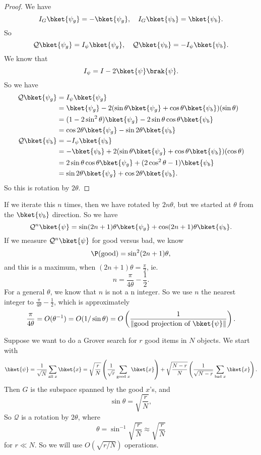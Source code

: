 \documentclass[a4paper]{article}
\begin{document}
\begin{proof}
  We have
  \[
    I_G \bket{\psi_g} = - \bket{\psi_g},\quad I_G \bket{\psi_b} = \bket{\psi_b}.
  \]
  So
  \[
    \mathcal{Q} \bket{\psi_g} = I_\psi \bket{\psi_g}, \quad \mathcal{Q} \bket{\psi_b} = - I_\psi \bket{\psi_b}.
  \]
  We know that
  \[
    I_\psi = I - 2\bket{\psi}\brak{\psi}.
  \]
  So we have
  \begin{align*}
    \mathcal{Q} \bket{\psi_g} &= I_\psi \bket{\psi_g}\\
    &= \bket{\psi_g} - 2(\sin \theta \bket{\psi_g} + \cos \theta \bket{\psi_b})(\sin \theta)\\
    &= (1 - 2 \sin^2 \theta) \bket{\psi_g} - 2 \sin \theta \cos \theta \bket{\psi_b}\\
    &= \cos 2\theta \bket{\psi_g} - \sin 2\theta \bket{\psi_b}\\
    \mathcal{Q} \bket{\psi_b} &= - I_\psi \bket{\psi_b}\\
    &= -\bket{\psi_b} + 2(\sin \theta \bket{\psi_g} + \cos \theta \bket{\psi_b})(\cos \theta)\\
    &= 2 \sin \theta \cos \theta \bket{\psi_g} + (2\cos^2 \theta - 1) \bket{\psi_b}\\
    &= \sin 2 \theta \bket{\psi_g} + \cos 2 \theta \bket{\psi_b}.
  \end{align*}
  So this is rotation by $2 \theta$.
\end{proof}

If we iterate this $n$ times, then we have rotated by $2n \theta$, but we started at $\theta$ from the $\bket{\psi_b}$ direction. So we have
\[
  \mathcal{Q}^n \bket{\psi} = \sin (2n + 1) \theta \bket{\psi_g} + \cos (2n + 1) \theta \bket{\psi_b}.
\]
If we measure $\mathcal{Q}^n\bket{\psi}$ for good versus bad, we know
\[
  \P(\text{good}) = \sin^2 (2n + 1)\theta,
\]
and this is a maximum, when $(2n + 1) \theta = \frac{\pi}{2}$, ie.
\[
  n = \frac{\pi}{4 \theta} - \frac{1}{2}.
\]
For a general $\theta$, we know that $n$ is not a n integer. So we use $n$ the nearest integer to $\frac{\pi}{4 \theta} - \frac{1}{2}$, which is approximately
\[
  \frac{\pi}{4 \theta} = O(\theta^{-1}) = O(1/\sin \theta) = O\left(\frac{1}{\|\text{good projection of }\bket{\psi}\|}\right).
\]

\begin{eg}
  Suppose we want to do a Grover search for $r$ good items in $N$ objects. We start with
  \[
    \bket{\psi} = \frac{1}{\sqrt{N}} \sum_{\text{all }x} \bket{x} = \sqrt{\frac{r}{N}}\left(\frac{1}{\sqrt{r}} \sum_{\text{good }x} \bket{x}\right) + \sqrt{\frac{N - r}{N}}\left(\frac{1}{\sqrt{N - r}} \sum_{\text{bad }x} \bket{x}\right).
  \]
  Then $G$ is the subspace spanned by the good $x$'s, and
  \[
    \sin \theta =\sqrt{\frac{r}{N}},
  \]
  So $\mathcal{Q}$ is a rotation by $2\theta$, where
  \[
    \theta = \sin^{-1}\sqrt{\frac{r}{N}} \approx \sqrt{\frac{r}{N}}
  \]
  for $r \ll N$. So we will use $O(\sqrt{r/N})$ operations.
\end{eg}
\end{document}
